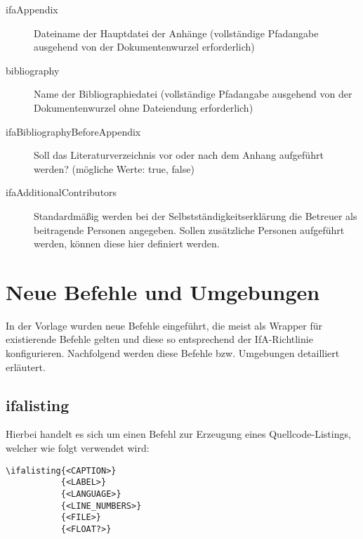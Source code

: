 \begin{description}
  \item[ifaAppendix] Dateiname der Hauptdatei der Anhänge (vollständige Pfadangabe ausgehend von der Dokumentenwurzel erforderlich)
  \item[bibliography] Name der Bibliographiedatei (vollständige Pfadangabe
  ausgehend von der Dokumentenwurzel ohne Dateiendung erforderlich)
  \item[ifaBibliographyBeforeAppendix] Soll das Literaturverzeichnis vor oder nach dem Anhang aufgeführt werden? (mögliche Werte: true, false)
  \item[ifaAdditionalContributors] Standardmäßig werden bei der
  Selbstständigkeitserklärung die Betreuer als beitragende Personen angegeben.
  Sollen zusätzliche Personen aufgeführt werden, können diese hier definiert werden.
\end{description}

\section{Neue Befehle und Umgebungen}
\label{sec:BefehleUndUmgebungen}

In der Vorlage wurden neue Befehle eingeführt, die meist als Wrapper für existierende Befehle gelten und diese so entsprechend der IfA-Richtlinie konfigurieren. Nachfolgend werden diese Befehle bzw. Umgebungen detailliert erläutert.

\subsection{ifalisting}
Hierbei handelt es sich um einen Befehl zur Erzeugung eines Quellcode-Listings, welcher wie folgt verwendet wird:

\begin{verbatim}
\ifalisting{<CAPTION>}
           {<LABEL>}
           {<LANGUAGE>}
           {<LINE_NUMBERS>}
           {<FILE>}
           {<FLOAT?>}
\end{verbatim}

